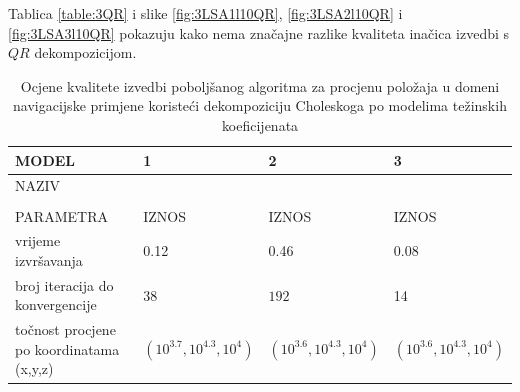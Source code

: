 \documentclass[a4paper,twoside,12pt]{memoir} %
\begin{document}
Tablica \ref{table:3QR} i slike \ref{fig:3LSA1l10QR}, \ref{fig:3LSA2l10QR} i \ref{fig:3LSA3l10QR} pokazuju kako nema značajne razlike kvaliteta inačica izvedbi s $QR$ dekompozicijom.\\

\begin{table}[H]
	\caption{Ocjene kvalitete izvedbi poboljšanog algoritma za procjenu položaja u domeni navigacijske primjene koristeći dekompoziciju Choleskoga po modelima težinskih koeficijenata}
	\begin{center}
		\begin{tabular}{||p{3cm}|p{3.1cm}||p{3.1cm}||p{3.1cm}|}
			\hline
			\cellcolor{lightgray} MODEL & 1 & 2 & 3\\
			\hline
			\hline
			\rowcolor{lightgray}NAZIV&   &   &   \\
			\rowcolor{lightgray}&   &   &   \\
			\multirow{-3}{0.5cm}{ \cellcolor{lightgray}PARAMETRA} & \multirow{-3}{0.5cm}{\cellcolor{lightgray}IZNOS} & \multirow{-3}{0.5cm}{\cellcolor{lightgray}IZNOS} & \multirow{-3}{0.5cm}{\cellcolor{lightgray}IZNOS} 
			\\
			\hline
			\vspace{0.1cm}
			vrijeme izvršavanja & \vspace{0.1cm}  0.12 & \vspace{0.1cm} 0.46 &\vspace{0.1cm} 0.08\\
			\vspace{0.1cm}
			broj iteracija do konvergencije &\vspace{0.1cm} $ 38$ &\vspace{0.1cm} $ 192$ &\vspace{0.1cm} 14 \\
			\vspace{0.1cm}
			točnost procjene po koordinatama (x,y,z) & \vspace{0.1cm} $(10^{3.7},10^{4.3},10^{4})$ &\vspace{0.1cm} $(10^{3.6},10^{4.3},10^{4})$ &\vspace{0.1cm} $(10^{3.6},10^{4.3},10^{4})$ \\
			\hline
		\end{tabular}
	\end{center}
	\label{table:3Ch}
\end{table}
\end{document}
